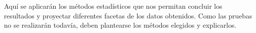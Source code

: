 Aquí se aplicarán los métodos estadísticos que nos permitan concluir los resultados y proyectar diferentes facetas de los datos obtenidos. Como las pruebas no se realizarán todavía, deben plantearse los métodos elegidos y explicarlos.
